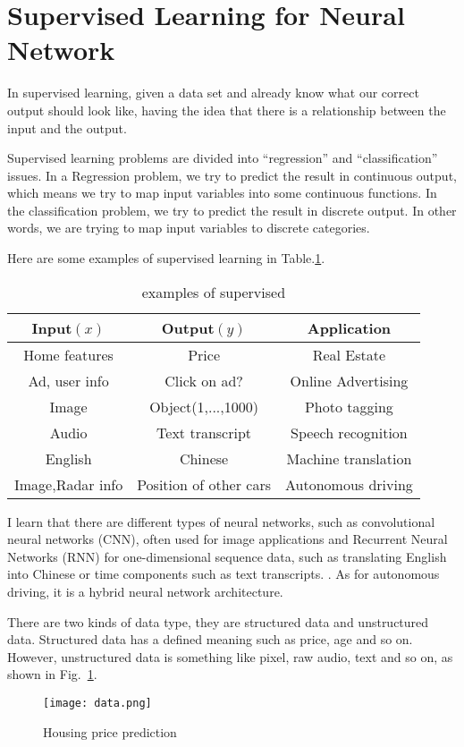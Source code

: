 \documentclass[a4paper]{article}
\begin{document}
\section{Supervised Learning for Neural Network}
In supervised learning,  given a data set and already know what our correct output should look like, having the idea that there is a relationship between the input and the output.
\par

Supervised learning problems are divided into ``regression'' and ``classification'' issues. In a Regression problem, we try to predict the result in continuous output, which means we try to map input variables into some continuous functions. In the classification problem, we try to predict the result in discrete output. In other words, we are trying to map input variables to discrete categories.
\par
Here are some examples of supervised learning in Table.\ref{tb1}.
\begin{table}[htbp]
  \centering
  \begin{tabular}{|c|c|c|}
  \hline
  Input$\left(x\right)$ & Output$\left(y\right)$ & Application\\
  \hline
  \hline
  Home features & Price & Real Estate\\
  Ad, user info & Click on ad? & Online Advertising\\
  Image & Object(1,...,1000) & Photo tagging\\
  Audio & Text transcript & Speech recognition\\
  English & Chinese & Machine translation\\
  Image,Radar info & Position of other cars&Autonomous driving\\
  \hline
  \end{tabular}
  \caption{examples of supervised}\label{tb1}
\end{table}
\par
I learn that there are different types of neural networks, such as convolutional neural networks (CNN), often used for image applications and Recurrent Neural Networks (RNN) for one-dimensional sequence data, such as translating English into Chinese or time components such as text transcripts. . As for autonomous driving, it is a hybrid neural network architecture.
\par
There are two kinds of data type, they are structured data and unstructured data. Structured data  has a defined meaning such as price, age and so on. However,  unstructured data is something like pixel, raw audio, text and so on, as shown in Fig.~\ref{fig6}.
\begin{figure}[htbp]
  \centering
  \texttt{[image: data.png]}\\
  \caption{Housing price prediction}\label{fig6}
\end{figure}
\end{document}

